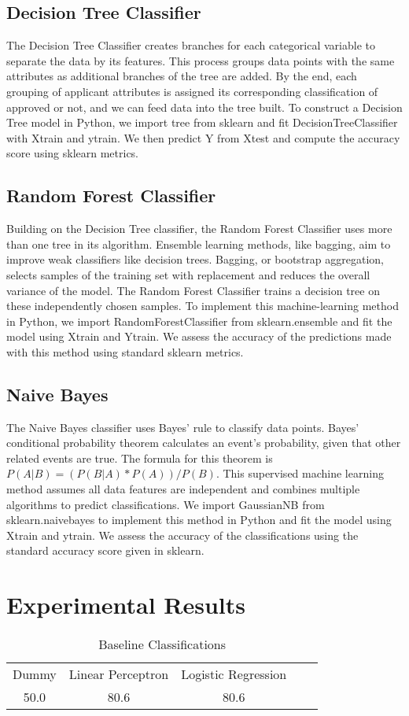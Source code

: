 \documentclass{article}
\begin{document}
\subsection{Decision Tree Classifier}
The Decision Tree Classifier creates branches for each categorical variable to separate the data by its features. This process groups data points with the same attributes as additional branches of the tree are added. By the end, each grouping of applicant attributes is assigned its corresponding classification of approved or not, and we can feed data into the tree built. To construct a Decision Tree model in Python, we import tree from sklearn and fit DecisionTreeClassifier with Xtrain and ytrain. We then predict Y from Xtest and compute the accuracy score using sklearn metrics.
\subsection{Random Forest Classifier}
Building on the Decision Tree classifier, the Random Forest Classifier uses more than one tree in its algorithm. Ensemble learning methods, like bagging, aim to improve weak classifiers like decision trees. Bagging, or bootstrap aggregation, selects samples of the training set with replacement and reduces the overall variance of the model. The Random Forest Classifier trains a decision tree on these independently chosen samples. To implement this machine-learning method in Python, we import RandomForestClassifier from sklearn.ensemble and fit the model using Xtrain and Ytrain. We assess the accuracy of the predictions made with this method using standard sklearn metrics. 
\subsection{Naive Bayes}
The Naive Bayes classifier uses Bayes' rule to classify data points. Bayes' conditional probability theorem calculates an event's probability, given that other related events are true. The formula for this theorem is \(P(A|B) = (P(B|A)*P(A))/P(B)\). This supervised machine learning method assumes all data features are independent and combines multiple algorithms to predict classifications. We import GaussianNB from sklearn.naivebayes to implement this method in Python and fit the model using Xtrain and ytrain. We assess the accuracy of the classifications using the standard accuracy score given in sklearn. 

 \section{Experimental Results}
\begin{table} [h]
    \centering
    \begin{tabular}{ccccc}
          Dummy& Linear Perceptron& Logistic Regression\\
          50.0& 80.6& 80.6\\
    \end{tabular}
    \caption{Baseline Classifications}
    \label{tab:my_label}
\end{table}
\end{document}
